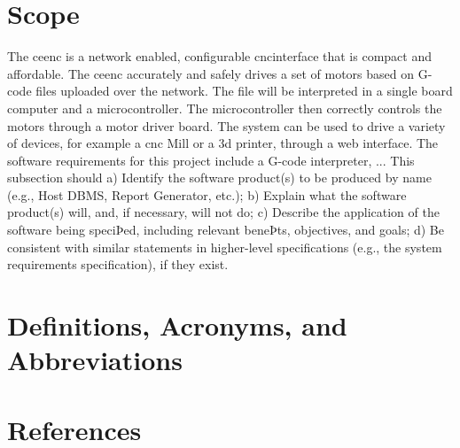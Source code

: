 \section{Scope}
The \gls{ceenc} is a network enabled, configurable \gls{cnc}interface that is compact and affordable.
The \gls{ceenc} accurately and safely drives a set of motors based on G-code files uploaded over the network.
The file will be interpreted in a single board computer and a microcontroller.
 The microcontroller then correctly controls the motors through a motor driver board.
The system can be used to drive a variety of devices, for example a \gls{cnc} Mill or a \gls{3d} printer, through a web interface.
\newline
\newline
The software requirements for this project include a G-code interpreter, ...
\newline
\newline
This subsection should
\newline
a) Identify the software product(s) to be produced by name (e.g., Host DBMS, Report Generator, etc.);
\newline
b) Explain what the software product(s) will, and, if necessary, will not do;
\newline
c) Describe the application of the software being speciÞed, including relevant beneÞts, objectives, and
goals;
\newline
d) Be consistent with similar statements in higher-level specifications (e.g., the system requirements
specification), if they exist.
\section{Definitions, Acronyms, and Abbreviations}
\hspace{12 pt}
\begin{acronym}
\end{acronym}

\section{References}
%

